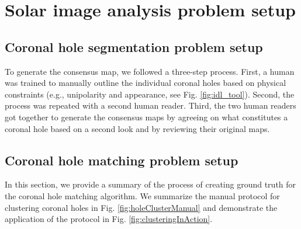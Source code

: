 \documentclass[journal]{IEEEtran}
\begin{document}
\section{Solar image analysis problem setup
             \label{sec:sec2_manualClassification}}
\subsection{Coronal hole segmentation problem setup}\label{sec:hole}

To generate the consensus map, we followed a three-step process.
First, a human was trained to manually outline
the individual coronal holes based on
physical constraints 
(e.g., unipolarity and appearance, see Fig. \ref{fig:idl_tool}).
Second, the process was repeated with a second human reader.
Third, the two human readers got together to generate the consensus maps
by agreeing on what constitutes a coronal hole based on a second look
and by reviewing their original maps.
\subsection{Coronal hole matching problem setup}\label{sec:match}
In this section, we provide a summary of the 
   process of creating ground truth for the 
   coronal hole matching algorithm.
We summarize the manual protocol for clustering
   coronal holes in Fig. \ref{fig:holeClusterManual}
   and demonstrate the application of the protocol
   in Fig. \ref{fig:clusteringInAction}.
   
\end{document}
